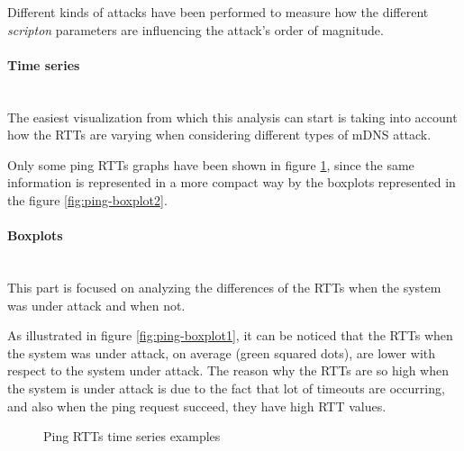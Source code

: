 \documentclass[fleqn, 11pt]{SelfArx} %
\begin{document}
Different kinds of attacks have been performed to measure how the different {\it{scripton}} parameters are influencing the attack's order of magnitude.

\paragraph{Time series}\mbox{}\\
The easiest visualization from which this analysis can start is taking into account how the RTTs are varying when considering different types of mDNS attack.

Only some ping RTTs graphs have been shown in figure \ref{fig:rtts-time-series}, since the same information is represented in a more compact way by the boxplots represented in the figure \ref{fig:ping-boxplot2}.

\paragraph{Boxplots}\mbox{}\\
This part is focused on analyzing the differences of the RTTs when the system was under attack and when not.

As illustrated in figure \ref{fig:ping-boxplot1}, it can be noticed that the RTTs when the system was under attack, on average (green squared dots), are lower with respect to the system under attack.
The reason why the RTTs are so high when the system is under attack is due to the fact that lot of timeouts are occurring, and also when the ping request
succeed, they have high RTT values.

\begin{figure}[H]
    \centering
    \qquad
    \caption{Ping RTTs time series examples}%
    \label{fig:rtts-time-series}%
\end{figure}
\end{document}
